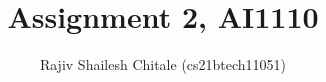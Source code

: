 \documentclass[journal,12pt,twocolumn]{IEEEtran}
\begin{document}
\makeatletter
{}
\makeatother

\let\StandardTheFigure\thefigure
\let\vec\mathbf


\def\putbox#1#2#3{\makebox[0in][l]{\makebox[#1][l]{}\raisebox{\baselineskip}[0in][0in]{\raisebox{#2}[0in][0in]{#3}}}}
     \def\rightbox#1{\makebox[0in][r]{#1}}
     \def\centbox#1{\makebox[0in]{#1}}
     \def\topbox#1{\raisebox{-\baselineskip}[0in][0in]{#1}}
     \def\midbox#1{\raisebox{-0.5\baselineskip}[0in][0in]{#1}}

\vspace{3cm}






\title{Assignment 2, AI1110}
\author{Rajiv Shailesh Chitale (cs21btech11051)}	

\maketitle
\end{document}
